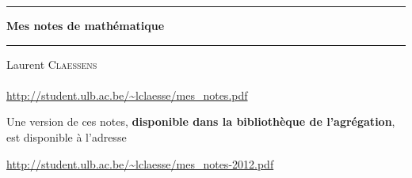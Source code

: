 
\thispagestyle{empty}
\begin{center}
  \begin{minipage}{15cm}
    \hrule\par
    \vspace{2mm}
    \begin{center}
    \Huge \bfseries Mes notes de mathématique \par
    \end{center}
    \hrule\par
  \end{minipage}
\end{center}

\vspace{2cm}

\begin{center}
    Laurent \textsc{Claessens}\\
    \\
    \url{http://student.ulb.ac.be/~lclaesse/mes_notes.pdf}

    \vspace{1cm}

    Une version de ces notes, {\bf disponible dans la bibliothèque de l'agrégation}, est disponible à l'adresse

    \url{http://student.ulb.ac.be/~lclaesse/mes_notes-2012.pdf}



\end{center}

\vfill

\LogoEtLicence


